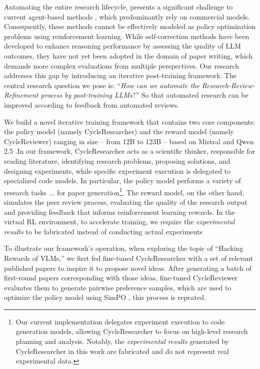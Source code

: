 \documentclass{article} %
\begin{document}
Automating the entire research lifecycle, \cite{oberg2022teaching} presents a significant challenge to current agent-based methods \citep{lu2024ai,si2024can,yang2024collaborative}, which predominantly rely on commercial models. Consequently, these methods cannot be effectively modeled as policy optimization problems using reinforcement learning. While self-correction methods \citep{weng-etal-2023-large,yuan2024self,lee2024rlaifvsrlhfscaling} have been developed to enhance reasoning performance by assessing the quality of LLM outcomes, they have not yet been adopted in the domain of paper writing, which demands more complex evaluations from multiple perspectives. Our research addresses this gap by introducing an iterative post-training framework. The central research question we pose is: ``\emph{How can we automate the Research-Review-Refinement process by post-training LLMs}?'' So that automated research can be improved according to feedback from automated reviews. 

We build a novel iterative training framework \citep{pang2024iterative} that contains two core components: the policy model (namely CycleResearcher) and the reward model (namely CycleReviewer) ranging in size -- from 12B to 123B -- based on Mistral \citep{jiang2023mistral} and Qwen 2.5 \citep{yang2024qwen2,qwen2.5}.In our framework, CycleResearcher acts as a scientific thinker, responsible for reading literature, identifying research problems, proposing solutions, and designing experiments, while specific experiment execution is delegated to specialized code models. In particular, the policy model performs a variety of research tasks ... for paper generation\footnote{Our current implementation delegates experiment execution to code generation models, allowing CycleResearcher to focus on high-level research planning and analysis. Notably, the \textit{experimental results} generated by CycleResearcher in this work are fabricated and do not represent real experimental data.}. The reward model, on the other hand, simulates the peer review process, evaluating the quality of the research output and providing feedback that informs reinforcement learning rewards. In the virtual RL environment, to accelerate training, we require the \textit{experimental results} to be fabricated instead of conducting actual experiments

To illustrate our framework's operation, when exploring the topic of ``Hacking Rewards of VLMs,'' we first fed fine-tuned CycleResearcher with a set of relevant published papers to inspire it to propose novel ideas. After generating a batch of first-round papers corresponding with those ideas, fine-tuned CycleReviewer evaluates them to generate pairwise preference samples, which are used to optimize the policy model using SimPO \citep{meng2024simposimplepreferenceoptimization}, this process is repeated.
\end{document}
